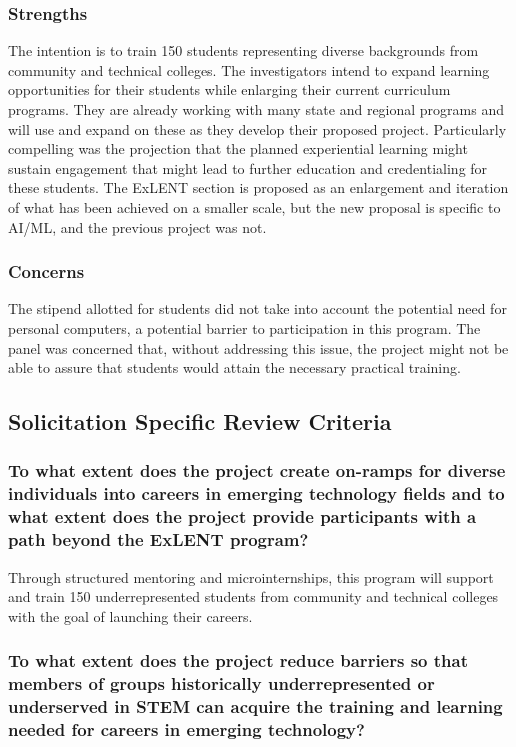 \subsubsection{Strengths}

The intention is to train 150 students representing diverse backgrounds from community and technical colleges. The investigators intend to expand learning opportunities for their students while enlarging their current curriculum programs. They are already working with many state and regional programs and will use and expand on these as they develop their proposed project. Particularly compelling was the projection that the planned experiential learning might sustain engagement that might lead to further education and credentialing for these students. The ExLENT section is proposed as an enlargement and iteration of what has been achieved on a smaller scale, but the new proposal is specific to AI/ML, and the previous project was not.

\subsubsection{Concerns}

The stipend allotted for students did not take into account the potential need for personal computers, a potential barrier to participation in this program. The panel was concerned that, without addressing this issue, the project might not be able to assure that students would attain the necessary practical training.

\subsection{Solicitation Specific Review Criteria}

\subsubsection{To what extent does the project create on-ramps for diverse individuals into careers in emerging technology fields and to what extent does the project provide participants with a path beyond the ExLENT program?}

Through structured mentoring and microinternships, this program will support and train 150 underrepresented students from community and technical colleges with the goal of launching their careers.

\subsubsection{To what extent does the project reduce barriers so that members of groups historically underrepresented or underserved in STEM can acquire the training and learning needed for careers in emerging technology?}

